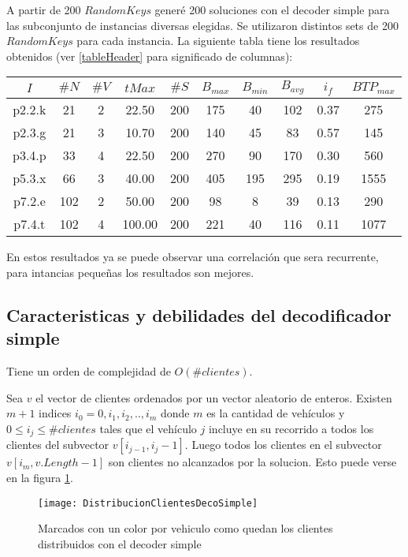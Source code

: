 A partir de 200 $RandomKeys$ generé 200 soluciones con el decoder simple para las subconjunto de instancias diversas elegidas. Se utilizaron distintos sets de 200 $RandomKeys$ para cada instancia. La siguiente tabla tiene los resultados obtenidos (ver \ref{tableHeader} para significado de columnas):

\begin{center}
\begin{tabular}{ |c|c|c|c|c|c|c|c|c|c| } 
\hline
$I$ & $\#N$ & $\#V$ & $tMax$ & $\#S$ & $B_{max}$ & $B_{min}$ & $B_{avg}$ & $i_{f}$ & $BTP_{max}$ \\
\hline
p2.2.k & 21 & 2 & 22.50 & 200 & 175 & 40 & 102 & 0.37 & 275  \\
p2.3.g & 21 & 3 & 10.70 & 200 & 140 & 45 & 83 & 0.57 & 145  \\
p3.4.p & 33 & 4 & 22.50 & 200 & 270 & 90 & 170 & 0.30 & 560  \\
p5.3.x & 66 & 3 & 40.00 & 200 & 405 & 195 & 295 & 0.19 & 1555  \\
p7.2.e & 102 & 2 & 50.00 & 200 & 98 & 8 & 39 & 0.13 & 290  \\
p7.4.t & 102 & 4 & 100.00 & 200 & 221 & 40 & 116 & 0.11 & 1077  \\
\hline
\end{tabular}
\end{center}

En estos resultados ya se puede observar una correlación que sera recurrente, para intancias pequeñas los resultados son mejores.

\subsection{Caracteristicas y debilidades del decodificador simple}

Tiene un orden de complejidad de $O(\#clientes)$.

\bigskip

Sea $v$ el vector de clientes ordenados por un vector aleatorio de enteros. Existen $m+1$ indices $i_0 = 0, i_1, i_2, .., i_m$ donde $m$ es la cantidad de vehículos y $0 \leq i_j \leq \#clientes$ tales que el vehículo $j$ incluye en su recorrido a todos los clientes del subvector $v[i_{j-1}, i_j-1]$. Luego todos los clientes en el subvector $v[i_m, v.Length - 1]$ son clientes no alcanzados por la solucion. Esto puede verse en la figura \ref{fig:DistribucionClientesDecoSimple}.

\begin{figure}[h]
	\caption{Marcados con un color por vehiculo como quedan los clientes distribuidos con el decoder simple}
	\centering
	\texttt{[image: DistribucionClientesDecoSimple]}
	\label{fig:DistribucionClientesDecoSimple}
\end{figure}

